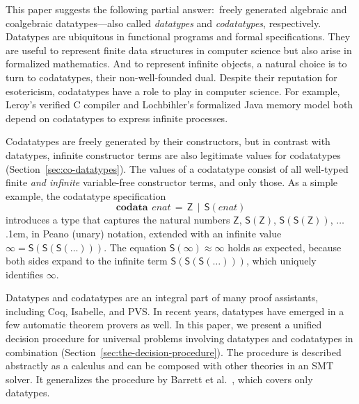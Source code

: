 \documentclass[letter]{article}
\theoremstyle{definition}
\newcommand\afterLdots{\kern.1em} %
\newcommand\keyw[1]{\textbf{#1}}
\newcommand\const[1]{\textsf{#1}}
\newcommand\ty[1]{\textit{#1}}
\newcommand{\teq}{\approx}
\begin{document}
This paper suggests the following partial answer:\ freely generated algebraic
and coalgebraic datatypes---also called \emph{datatypes} and
\emph{codatatypes}, respectively.
Datatypes are ubiquitous in functional programs and formal specifications.
They are useful to represent finite data structures in computer
science but also arise in formalized mathematics.
And to represent infinite objects,
a natural choice is to turn to codatatypes,
their non-well-founded dual.
%
Despite their reputation for esotericism, codatatypes have a
role to play in computer science. For example,
Leroy's verified C compiler %
and Lochbihler's formalized Java memory model
 both depend on codatatypes to express infinite
processes.

Codatatypes are freely generated by their constructors, but in contrast with datatypes,
infinit\-e constructor terms are also legitimate values for codatatypes
(Section~\ref{sec:co-datatypes}). The
values of a codatatype consist of all well-typed finite \emph{and infinite} variable-free
constructor
terms, and only those. As a simple example, the codatatype specification
%
\[\keyw{codata}~\,\ty{enat} \,=\, \const{Z} \,\mid\, \const{S}(\ty{enat})\]
%
introduces a type that
captures the natural numbers $\const{Z}$, $\const{S}(\const{Z})$, $\const{S}(\const{S}(\const{Z}))$, $\ldots$\afterLdots{},
in Peano (unary) notation, extended with an
infinite value $\infty = \const{S}(\const{S}(\const{S}(\ldots)))$.
The equation $\const{S}(\infty) \teq \infty$ holds as expected,
because both sides expand to the infinite term
$\const{S}(\const{S}(\const{S}(\ldots)))$, which uniquely identifies
$\infty$.

Datatypes and codatatypes are an integral part of many proof assistants,
including Coq, Isabelle, and PVS. In recent years, datatypes
have emerged in a few automatic theorem provers as well.
In this paper, we present a
unified decision procedure for universal problems involving datatypes and codatatypes
in combination (Section~\ref{sec:the-decision-procedure}).
The procedure is described abstractly as a %
calculus and can be composed with other theories in an SMT solver.
It generalizes the procedure by Barrett et al.\
,
which covers only datatypes.
\end{document}
